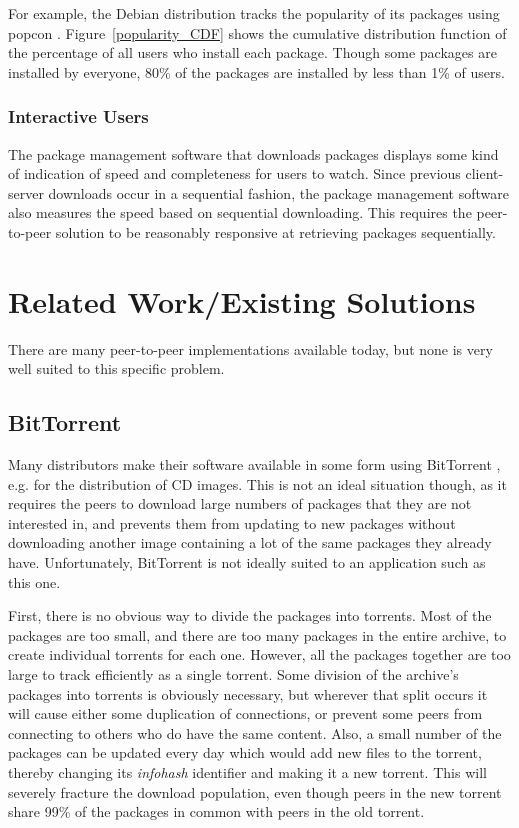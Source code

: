 \documentclass[conference]{IEEEtran}
\begin{document}
For example, the Debian distribution tracks the popularity of its
packages using popcon \cite{popcon}. Figure~\ref{popularity_CDF}
shows the cumulative distribution function of the percentage of all
users who install each package. Though some packages are installed
by everyone, 80\% of the packages are installed by less than 1\% of
users.

\subsubsection{Interactive Users}

The package management software that downloads packages displays
some kind of indication of speed and completeness for users to
watch. Since previous client-server downloads occur in a sequential
fashion, the package management software also measures the speed
based on sequential downloading. This requires the peer-to-peer
solution to be reasonably responsive at retrieving packages
sequentially.


\section{Related Work/Existing Solutions}
\label{related}

There are many peer-to-peer implementations available today, but
none is very well suited to this specific problem.

\subsection{BitTorrent}
\label{bittorrent}

Many distributors make their software available in some form using
BitTorrent \cite{COHEN03}, e.g. for the distribution of CD
images. This is not an ideal situation though, as it requires the
peers to download large numbers of packages that they are not
interested in, and prevents them from updating to new packages
without downloading another image containing a lot of the same
packages they already have. Unfortunately, BitTorrent is not ideally
suited to an application such as this one.

First, there is no obvious way to divide the packages into torrents.
Most of the packages are too small, and there are too many packages
in the entire archive, to create individual torrents for each one.
However, all the packages together are too large to track
efficiently as a single torrent. Some division of the archive's
packages into torrents is obviously necessary, but wherever that
split occurs it will cause either some duplication of connections,
or prevent some peers from connecting to others who do have the same
content. Also, a small number of the packages can be updated every
day which would add new files to the torrent, thereby changing its
\emph{infohash} identifier and making it a new torrent. This will
severely fracture the download population, even though peers in the
new torrent share 99\% of the packages in common with peers in the
old torrent.
\end{document}
